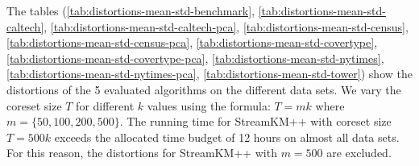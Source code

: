 The tables 
(\cref{tab:distortions-mean-std-benchmark},
 \cref{tab:distortions-mean-std-caltech},
 \cref{tab:distortions-mean-std-caltech-pca},
 \cref{tab:distortions-mean-std-census},
 \cref{tab:distortions-mean-std-census-pca},
 \cref{tab:distortions-mean-std-covertype},
 \cref{tab:distortions-mean-std-covertype-pca},
 \cref{tab:distortions-mean-std-nytimes},
 \cref{tab:distortions-mean-std-nytimes-pca},
 \cref{tab:distortions-mean-std-tower})
 show the distortions of the 5 evaluated algorithms on the different data sets.
We vary the coreset size $T$ for different $k$ values using the formula: $T=mk$ where $m = \{50, 100, 200, 500\}$.
The running time for StreamKM++ with coreset size $T=500k$ exceeds the allocated time budget of 12 hours on almost all data sets.
For this reason, the distortions for StreamKM++ with $m=500$ are excluded.



